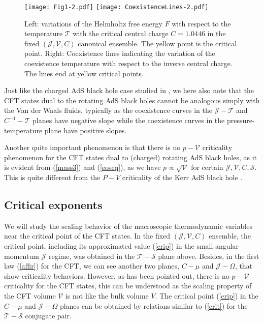 \documentclass[a4paper,11pt]{article}
\newcommand{\eq}[1]{(\ref{#1})}
\def\T{\mathcal{T}} \def\O{\mathcal{O}} \def\S{\mathcal{S}}\def\J{\mathcal{J}}\def\V{\mathcal{V}}\def\Q{\mathcal{Q}}\def\F{\mathcal{F}}
\begin{document}
\begin{figure}[tbp!]
\begin{center}
\texttt{[image: Fig1-2.pdf]}
\texttt{[image: CoexistenceLines-2.pdf]}
\end{center}
\vspace{-5mm}
 \caption {Left: variations of the Helmholtz free energy $F$ with respect to the temperature $\T$ with the critical central charge $C=1.0446$ in the fixed $(\J, \V, C)$ canonical ensemble. The yellow point is the critical point. Right: Coexistence lines indicating the variation of the coexistence temperature with respect to the inverse central charge. The lines end at yellow critical points.}
 \label{fig3}
\end{figure}




Just like the charged AdS black hole case studied in \cite{Cong:2021fnf}, we here also note that the CFT states dual to the rotating AdS black holes cannot be analogous simply  with the Van der Waals fluids, typically as the coexistence curves in the $\J-\T$ and $C^{-1}-\T$ planes have negative slope while the coexistence curves in the pressure-temperature plane have positive slopes.

Another quite important phenomenon is that there is no $p-\V$ criticality phenomenon for the CFT states dual to (charged) rotating AdS black holes, as it is evident from \eq{mass3} and \eq{eoseq}, as we have $p\propto \sqrt{\V}$ for certain $\J, \mathcal{V}, C, \S$. This is quite different from the $P-V$ criticality of the Kerr AdS black hole \cite{Gunasekaran:2012dq}.




\subsection{Critical exponents}
We will study the scaling behavior of the macroscopic thermodynamic variables near the critical point of the CFT states. 
In the fixed $(\mathcal{J}, \mathcal{V}, C)$ ensemble, the critical point, including its approximated value \eq{crip} in the small angular momentum $\J$ regime, was  obtained in the $\T-\S$ plane above. Besides, in the first law \eq{affir} for the CFT, we can see another two planes, $C-\mu$ and $\mathcal{J}-\Omega$, that show criticality behaviors. However, as has been pointed out, there is no $p-\V$ criticality for the CFT states, this can be understood as the scaling property of the CFT volume $\V$ is not like the bulk volume $V$. The critical point \eq{crip} in the $C-\mu$ and $\mathcal{J}-\Omega$ planes can be obtained by relations similar to \eq{crit} for the $\T-\S$ conjugate pair.
\end{document}
